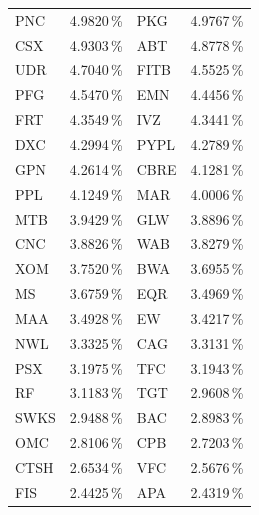 \begin{longtable}{l c | l c}
    PNC    & 4.9820\,\%             & PKG    & 4.9767\,\%                                    \\
    CSX    & 4.9303\,\%             & ABT    & 4.8778\,\%                                    \\
    UDR    & 4.7040\,\%             & FITB   & 4.5525\,\%                                    \\
    PFG    & 4.5470\,\%             & EMN    & 4.4456\,\%                                    \\
    FRT    & 4.3549\,\%             & IVZ    & 4.3441\,\%                                    \\
    DXC    & 4.2994\,\%             & PYPL   & 4.2789\,\%                                    \\
    GPN    & 4.2614\,\%             & CBRE   & 4.1281\,\%                                    \\
    PPL    & 4.1249\,\%             & MAR    & 4.0006\,\%                                    \\
    MTB    & 3.9429\,\%             & GLW    & 3.8896\,\%                                    \\
    CNC    & 3.8826\,\%             & WAB    & 3.8279\,\%                                    \\
    XOM    & 3.7520\,\%             & BWA    & 3.6955\,\%                                    \\
    MS     & 3.6759\,\%             & EQR    & 3.4969\,\%                                    \\
    MAA    & 3.4928\,\%             & EW     & 3.4217\,\%                                    \\
    NWL    & 3.3325\,\%             & CAG    & 3.3131\,\%                                    \\
    PSX    & 3.1975\,\%             & TFC    & 3.1943\,\%                                    \\
    RF     & 3.1183\,\%             & TGT    & 2.9608\,\%                                    \\
    SWKS   & 2.9488\,\%             & BAC    & 2.8983\,\%                                    \\
    OMC    & 2.8106\,\%             & CPB    & 2.7203\,\%                                    \\
    CTSH   & 2.6534\,\%             & VFC    & 2.5676\,\%                                    \\
    FIS    & 2.4425\,\%             & APA    & 2.4319\,\%                                    \\

\end{longtable}
